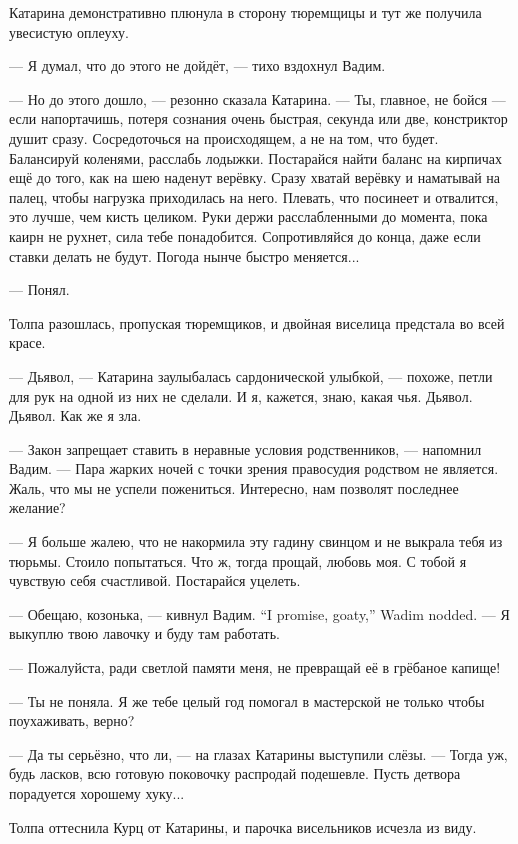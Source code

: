 Катарина демонстративно плюнула в сторону тюремщицы и тут же получила увесистую оплеуху.

--- Я думал, что до этого не дойдёт, --- тихо вздохнул Вадим.

--- Но до этого дошло, --- резонно сказала Катарина.
--- Ты, главное, не бойся --- если напортачишь, потеря сознания очень быстрая, секунда или две, констриктор душит сразу.
Сосредоточься на происходящем, а не на том, что будет.
Балансируй коленями, расслабь лодыжки.
Постарайся найти баланс на кирпичах ещё до того, как на шею наденут верёвку.
Сразу хватай верёвку и наматывай на палец, чтобы нагрузка приходилась на него.
Плевать, что посинеет и отвалится, это лучше, чем кисть целиком.
Руки держи расслабленными до момента, пока каирн не рухнет, сила тебе понадобится.
Сопротивляйся до конца, даже если ставки делать не будут.
Погода нынче быстро меняется...

--- Понял.

Толпа разошлась, пропуская тюремщиков, и двойная виселица предстала во всей красе.

--- Дьявол, --- Катарина заулыбалась сардонической улыбкой, --- похоже, петли для рук на одной из них не сделали.
И я, кажется, знаю, какая чья.
Дьявол.
Дьявол.
Как же я зла.

--- Закон запрещает ставить в неравные условия родственников, --- напомнил Вадим.
--- Пара жарких ночей с точки зрения правосудия родством не является.
Жаль, что мы не успели пожениться.
Интересно, нам позволят последнее желание?

--- Я больше жалею, что не накормила эту гадину свинцом и не выкрала тебя из тюрьмы.
Стоило попытаться.
Что ж, тогда прощай, любовь моя.
С тобой я чувствую себя счастливой.
Постарайся уцелеть.

{--- Обещаю, козонька, --- кивнул Вадим.}
{``I promise, goaty,'' Wadim nodded.}
--- Я выкуплю твою лавочку и буду там работать.

--- Пожалуйста, ради светлой памяти меня, не превращай её в грёбаное капище!

--- Ты не поняла.
Я же тебе целый год помогал в мастерской не только чтобы поухаживать, верно?

--- Да ты серьёзно, что ли, --- на глазах Катарины выступили слёзы.
--- Тогда уж, будь ласков, всю готовую поковочку распродай подешевле.
Пусть детвора порадуется хорошему хуку...

Толпа оттеснила Курц от Катарины, и парочка висельников исчезла из виду.

